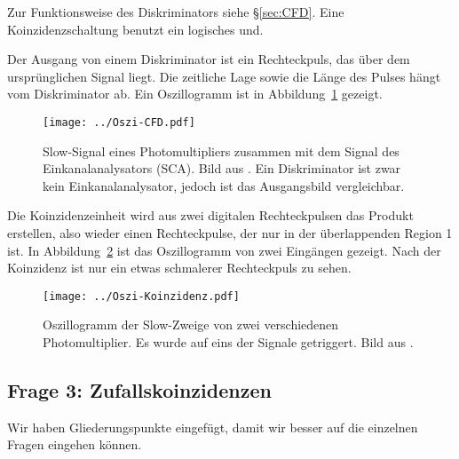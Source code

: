 \documentclass[11pt, ngerman, fleqn, DIV=15, headinclude, BCOR=2cm]{scrreprt}
\begin{document}
Zur Funktionsweise des Diskriminators siehe §\ref{sec:CFD}. Eine
Koinzidenzschaltung benutzt ein logisches und.

Der Ausgang von einem Diskriminator ist ein Rechteckpuls, das über dem
ursprünglichen Signal liegt. Die zeitliche Lage sowie die Länge des Pulses
hängt vom Diskriminator ab. Ein Oszillogramm ist in
Abbildung~\ref{fig:oszi-cfd} gezeigt.

\begin{figure}[htbp]
    \centering
    \texttt{[image: ../Oszi-CFD.pdf]}
    \caption{%
        Slow-Signal eines Photomultipliers zusammen mit dem
        Signal des Einkanalanalysators (SCA). Bild aus
        \parencite[Abbildung~2.8]{Ueding/525}. Ein Diskriminator ist zwar kein
        Einkanalanalysator, jedoch ist das Ausgangsbild vergleichbar.
    }
    \label{fig:oszi-cfd}
\end{figure}

Die Koinzidenzeinheit wird aus zwei digitalen Rechteckpulsen das Produkt
erstellen, also wieder einen Rechteckpulse, der nur in der überlappenden Region
1 ist. In Abbildung~\ref{fig:oszi-koinzidenz} ist das Oszillogramm von zwei
Eingängen gezeigt. Nach der Koinzidenz ist nur ein etwas schmalerer
Rechteckpuls zu sehen.

\begin{figure}[htbp]
    \centering
    \texttt{[image: ../Oszi-Koinzidenz.pdf]}
    \caption{%
        Oszillogramm der Slow-Zweige von zwei verschiedenen Photomultiplier. Es
        wurde auf eins der Signale getriggert. Bild aus
        \parencite[Abbildung~2.24]{Ueding/525}.
    }
    \label{fig:oszi-koinzidenz}
\end{figure}

\subsection{Frage 3: Zufallskoinzidenzen}

Wir haben Gliederungspunkte eingefügt, damit wir besser auf die einzelnen
Fragen eingehen können.
\end{document}
